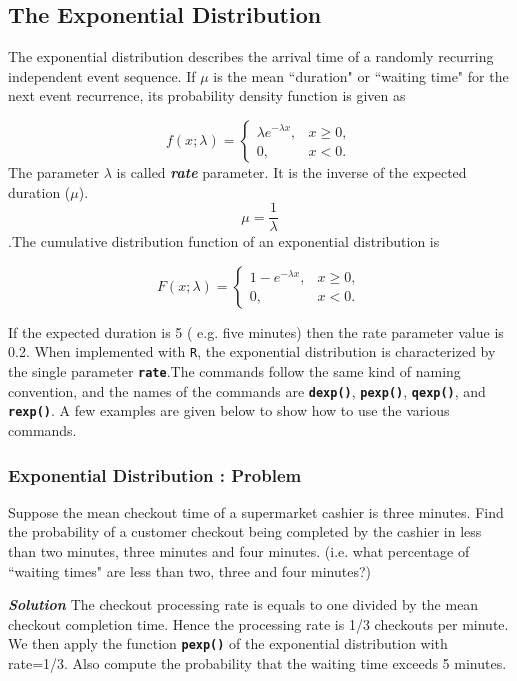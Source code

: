 \newpage

\subsection{The Exponential Distribution}


The exponential distribution describes the arrival time of a randomly recurring independent event sequence. If $\mu$ is the mean ``duration" or ``waiting time" for the next event recurrence, its probability density function is given as

\[f(x;\lambda) = \begin{cases}
\lambda e^{-\lambda x}, & x \ge 0, \\
0, & x < 0.
\end{cases}\]
The parameter $\lambda$  is called \textbf{\emph{rate}} parameter. It is the inverse of the expected duration ($\mu$).\\
\[\mu= \frac{1}{\lambda}\].The cumulative distribution function of an exponential distribution is

\[
F(x;\lambda) = \begin{cases}
1-e^{-\lambda x}, & x \ge 0, \\
0, & x < 0.
\end{cases}\]

If the expected duration is 5 ( e.g. five minutes) then the rate parameter value is 0.2. When implemented with \texttt{R}, the exponential distribution is characterized by the single parameter \texttt{\textbf{rate}}.The commands follow the same kind of naming convention, and the names of the commands are \texttt{\textbf{dexp()}}, \texttt{\textbf{pexp()}}, \texttt{\textbf{qexp()}}, and \texttt{\textbf{rexp()}}. A few examples are given below to show how to use the various commands. 

\subsubsection{Exponential Distribution : Problem}
Suppose the mean checkout time of a supermarket cashier is three minutes. Find the probability of a customer checkout being completed by the cashier in less than two minutes, three minutes and four minutes. 
(i.e. what percentage of ``waiting times" are less than two, three and four minutes?)

\textbf{\emph{Solution}} The checkout processing rate is equals to one divided by the mean checkout completion time. 
Hence the processing rate is 1/3 checkouts per minute. We then apply the function \texttt{\textbf{pexp()}} of the exponential distribution with rate=1/3. 
Also compute the probability that the waiting time exceeds 5 minutes.



